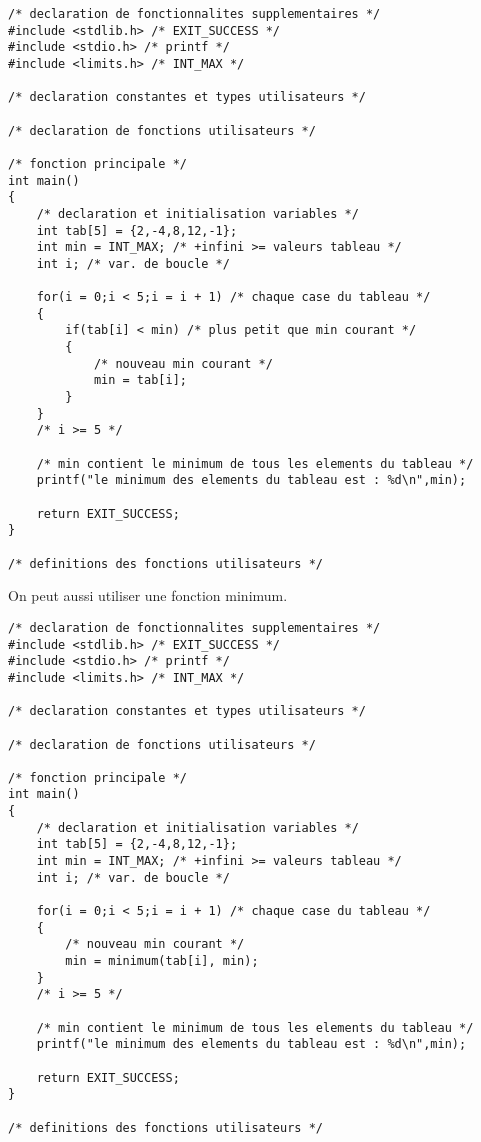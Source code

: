 \begin{correction}
\begin{verbatim}
/* declaration de fonctionnalites supplementaires */
#include <stdlib.h> /* EXIT_SUCCESS */
#include <stdio.h> /* printf */
#include <limits.h> /* INT_MAX */

/* declaration constantes et types utilisateurs */

/* declaration de fonctions utilisateurs */

/* fonction principale */
int main()
{
    /* declaration et initialisation variables */
    int tab[5] = {2,-4,8,12,-1};
    int min = INT_MAX; /* +infini >= valeurs tableau */
    int i; /* var. de boucle */

    for(i = 0;i < 5;i = i + 1) /* chaque case du tableau */
    {
        if(tab[i] < min) /* plus petit que min courant */
        {
            /* nouveau min courant */
            min = tab[i];
        }
    }
    /* i >= 5 */

    /* min contient le minimum de tous les elements du tableau */
    printf("le minimum des elements du tableau est : %d\n",min);

    return EXIT_SUCCESS;
}

/* definitions des fonctions utilisateurs */
\end{verbatim}
On peut aussi utiliser une fonction minimum.
\begin{verbatim}
/* declaration de fonctionnalites supplementaires */
#include <stdlib.h> /* EXIT_SUCCESS */
#include <stdio.h> /* printf */
#include <limits.h> /* INT_MAX */

/* declaration constantes et types utilisateurs */

/* declaration de fonctions utilisateurs */

/* fonction principale */
int main()
{
    /* declaration et initialisation variables */
    int tab[5] = {2,-4,8,12,-1};
    int min = INT_MAX; /* +infini >= valeurs tableau */
    int i; /* var. de boucle */

    for(i = 0;i < 5;i = i + 1) /* chaque case du tableau */
    {
        /* nouveau min courant */
        min = minimum(tab[i], min);
    }
    /* i >= 5 */

    /* min contient le minimum de tous les elements du tableau */
    printf("le minimum des elements du tableau est : %d\n",min);

    return EXIT_SUCCESS;
}

/* definitions des fonctions utilisateurs */
\end{verbatim}
\end{correction}

